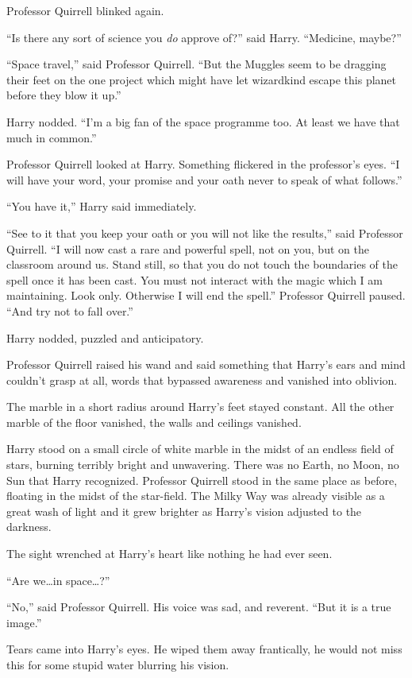 Professor Quirrell blinked again.

“Is there any sort of science you \emph{do} approve of?” said Harry.
“Medicine, maybe?”

“Space travel,” said Professor Quirrell.
“But the Muggles seem to be dragging their feet on the one project which might have let wizardkind escape this planet before they blow it up.”

Harry nodded.
“I’m a big fan of the space programme too. At least we have that much in common.”

Professor Quirrell looked at Harry. Something flickered in the professor’s eyes.
“I will have your word, your promise and your oath never to speak of what follows.”

“You have it,” Harry said immediately.

“See to it that you keep your oath or you will not like the results,” said Professor Quirrell.
“I will now cast a rare and powerful spell, not on you, but on the classroom around us. Stand still, so that you do not touch the boundaries of the spell once it has been cast. You must not interact with the magic which I am maintaining. Look only. Otherwise I will end the spell.” Professor Quirrell paused.
“And try not to fall over.”

Harry nodded, puzzled and anticipatory.

Professor Quirrell raised his wand and said something that Harry’s ears and mind couldn’t grasp at all, words that bypassed awareness and vanished into oblivion.

The marble in a short radius around Harry’s feet stayed constant. All the other marble of the floor vanished, the walls and ceilings vanished.

Harry stood on a small circle of white marble in the midst of an endless field of stars, burning terribly bright and unwavering. There was no Earth, no Moon, no Sun that Harry recognized. Professor Quirrell stood in the same place as before, floating in the midst of the star-field. The Milky Way was already visible as a great wash of light and it grew brighter as Harry’s vision adjusted to the darkness.

The sight wrenched at Harry’s heart like nothing he had ever seen.

“Are we…in space…?”

“No,” said Professor Quirrell. His voice was sad, and reverent.
“But it is a true image.”

Tears came into Harry’s eyes. He wiped them away frantically, he would not miss this for some stupid water blurring his vision.


